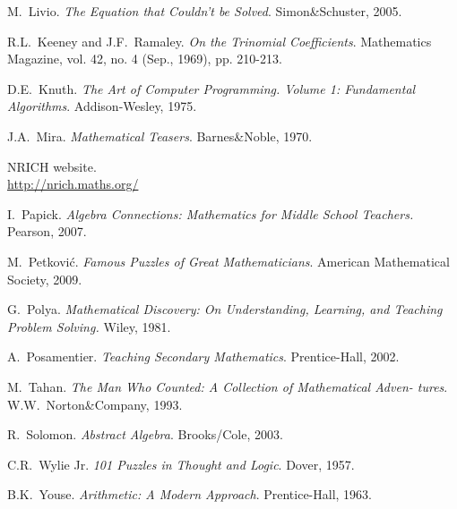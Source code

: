 \begin{fullwidth}
\begin{thebibliography}{99}
 M.\ Livio. \emph{The Equation that Couldn't be
  Solved}. Simon\&Schuster, 2005.

 R.L.\ Keeney and J.F.\ Ramaley. \emph{On the Trinomial Coefficients}. Mathematics Magazine, vol. 42, no. 4 (Sep., 1969), pp. 210-213.

 D.E.\ Knuth. \emph{The Art of Computer Programming. Volume 1: Fundamental Algorithms}. Addison-Wesley, 1975.

 J.A.\ Mira. \emph{Mathematical Teasers}. Barnes\&Noble, 1970.

 NRICH website.
\\ \url{http://nrich.maths.org/}

 I.\ Papick. \emph{Algebra Connections: Mathematics
  for Middle School Teachers.} Pearson, 2007.

 M.\ Petkovi\'{c}. \emph{Famous Puzzles of Great Mathematicians}. American Mathematical Society, 2009.

 G.\ Polya. \emph{Mathematical Discovery: On
  Understanding, Learning, and Teaching Problem Solving.} Wiley, 1981.

 A.\ Posamentier. \emph{Teaching Secondary Mathematics}. Prentice-Hall, 2002.

 M.\ Tahan. \emph{The Man Who Counted: A Collection of Mathematical Adven-
tures}. W.W.\ Norton\&Company, 1993.

 R.\ Solomon. \emph{Abstract Algebra}. Brooks/Cole, 2003.

 C.R.\ Wylie Jr. \emph{101 Puzzles in Thought and
  Logic}. Dover, 1957.

 B.K.\ Youse. \emph{Arithmetic: A Modern Approach}. Prentice-Hall, 1963.


\end{thebibliography}
\end{fullwidth}


\printindex


